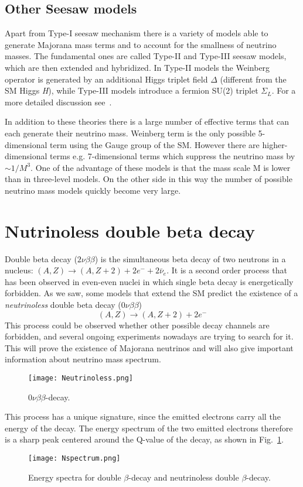 \documentclass{subnucbo}
\begin{document}
\subsection{Other Seesaw models}
Apart from Type-I seesaw mechanism there is a variety of models able to generate Majorana mass terms and to account for the smallness of neutrino masses.
The fundamental ones are called Type-II and Type-III seesaw models, which are then extended and hybridized.
In Type-II models the Weinberg operator is generated by an additional Higgs triplet field $\Delta$ (different from the SM Higgs \emph{H}), while Type-III models introduce a fermion SU(2) triplet $\Sigma_L$. For a more detailed discussion see~\cite{ref:front}.

In addition to these theories there is a large number of effective terms that can each generate their neutrino mass. Weinberg term is the only possible 5-dimensional term using the Gauge group of the SM. However there are higher-dimensional terms e.g. 7-dimensional terms which suppress the neutrino mass by $\sim1/M^3$.
One of the advantage of these models is that the mass scale M is lower than in three-level models. On the other side in this way the number of possible neutrino mass models quickly become very large.

\section{Nutrinoless double beta decay}
Double beta decay ($2\nu\beta\beta$) is the simultaneous beta decay of two neutrons in a nucleus: $(A, Z)\rightarrow(A, Z+2)+2e^-+2\bar{\nu}_e$.
It is a second order process that has been observed in even-even nuclei in which single beta decay is energetically forbidden. As we saw, some models that extend the SM predict the existence of a \emph{neutrinoless} double beta decay ($0\nu\beta\beta$)
\begin{equation}
(A, Z)\rightarrow(A, Z+2)+2e^-
\end{equation}
This process could be observed whether other possible decay channels are forbidden, and several ongoing experiments nowadays are trying to search for it. This will prove the existence of Majorana neutrinos and will also give important information about neutrino mass spectrum.
\begin{wrapfigure}{l}
{0.35\textwidth}
\texttt{[image: Neutrinoless.png]}
\caption{$0\nu\beta\beta$-decay.}
\vspace{-10pt}
\end{wrapfigure}
This process has a unique signature, since the emitted electrons carry all the energy of the decay. The energy spectrum of the two emitted electrons therefore is a sharp peak centered around the Q-value of the decay, as shown in Fig.~\ref{fig:Nspectrum}.
\begin{figure}
\centering
\texttt{[image: Nspectrum.png]}
\caption{Energy spectra for double $\beta$-decay and neutrinoless double $\beta$-decay.}
\label{fig:Nspectrum}
\end{figure}
\end{document}
